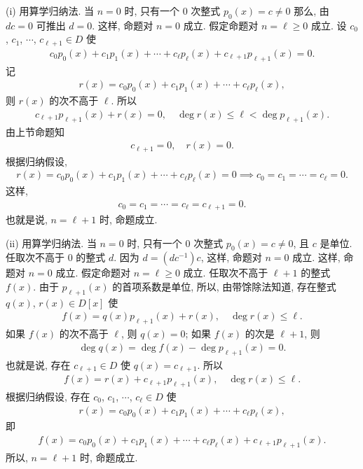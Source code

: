 \begin{pf}
    (i) 用算学归纳法. 当 $n=0$ 时, 只有一个 $0$ 次整式 $p_0 (x) = c \neq 0$ 那么, 由 $dc = 0$ 可推出 $d = 0$. 这样, 命题对 $n=0$ 成立. 假定命题对 $n = \ell \geq 0$ 成立. 设 $c_0$, $c_1$, $\cdots$, $c_{\ell + 1} \in D$ 使
    \begin{align*}
        c_0 p_0 (x) + c_1 p_1 (x) + \cdots + c_{\ell} p_{\ell} (x) + c_{\ell + 1} p_{\ell + 1} (x) = 0.
    \end{align*}
    记
    \begin{align*}
        r(x) = c_0 p_0 (x) + c_1 p_1 (x) + \cdots + c_{\ell} p_{\ell} (x),
    \end{align*}
    则 $r(x)$ 的次不高于 $\ell$. 所以
    \begin{align*}
        c_{\ell + 1} p_{\ell + 1} (x) + r(x) = 0, \quad \deg r(x) \leq \ell < \deg p_{\ell + 1} (x).
    \end{align*}
    由上节命题知
    \begin{align*}
        c_{\ell + 1} = 0, \quad r(x) = 0.
    \end{align*}
    根据归纳假设,
    \begin{align*}
        r(x) = c_0 p_0 (x) + c_1 p_1 (x) + \cdots + c_{\ell} p_{\ell} (x) = 0 \implies c_0 = c_1 = \cdots = c_{\ell} = 0.
    \end{align*}
    这样,
    \begin{align*}
        c_0 = c_1 = \cdots = c_{\ell} = c_{\ell + 1} = 0.
    \end{align*}
    也就是说, $n=\ell + 1$ 时, 命题成立.

    (ii) 用算学归纳法. 当 $n=0$ 时, 只有一个 $0$ 次整式 $p_0 (x) = c \neq 0$, 且 $c$ 是单位. 任取次不高于 $0$ 的整式 $d$. 因为 $d = (dc^{-1})c$, 这样, 命题对 $n=0$ 成立. 这样, 命题对 $n=0$ 成立. 假定命题对 $n = \ell \geq 0$ 成立. 任取次不高于 $\ell + 1$ 的整式 $f(x)$. 由于 $p_{\ell + 1} (x)$ 的首项系数是单位, 所以, 由带馀除法知道, 存在整式 $q(x)$, $r(x) \in D[x]$ 使
    \begin{align*}
        f(x) = q(x) p_{\ell + 1} (x) + r(x), \quad \deg r(x) \leq \ell.
    \end{align*}
    如果 $f(x)$ 的次不高于 $\ell$, 则 $q(x) = 0$; 如果 $f(x)$ 的次是 $\ell + 1$, 则
    \begin{align*}
        \deg q(x) = \deg f(x) - \deg p_{\ell+1} (x) = 0.
    \end{align*}
    也就是说, 存在 $c_{\ell + 1} \in D$ 使 $q(x) = c_{\ell + 1}$. 所以
    \begin{align*}
        f(x) = r(x) + c_{\ell + 1} p_{\ell + 1} (x), \quad \deg r(x) \leq \ell.
    \end{align*}
    根据归纳假设, 存在 $c_0$, $c_1$, $\cdots$, $c_{\ell} \in D$ 使
    \begin{align*}
        r(x) = c_0 p_0 (x) + c_1 p_1 (x) + \cdots + c_{\ell} p_{\ell} (x),
    \end{align*}
    即
    \begin{align*}
        f(x) = c_0 p_0 (x) + c_1 p_1 (x) + \cdots + c_{\ell} p_{\ell} (x) + c_{\ell + 1} p_{\ell + 1} (x).
    \end{align*}
    所以, $n = \ell + 1$ 时, 命题成立.
\end{pf}

